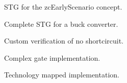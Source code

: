 \documentclass[british, journal]{IEEEtran}
\begin{document}
\begin{figure}[H]
	\begin{centering}
		\par\end{centering}
		\protect\caption{\label{fig:zcEarlyScenario STG}STG for the \textsf{zcEarlyScenario} concept.}
\end{figure}

\begin{figure}[H]
	\begin{centering}
		\par\end{centering}
	\begin{centering}
				\protect\caption{\label{fig:buck STG}Complete STG for a buck converter.}
		\par\end{centering}
\end{figure}

\begin{figure}[H]
	\begin{centering}
		\par\end{centering}
	\begin{centering}
				\protect\caption{\label{fig:custom_assertion}Custom verification of no shortcircuit.}
		\par\end{centering}
\end{figure}

\begin{figure}[H]
	\begin{centering}
		\par\end{centering}
	
		\protect\caption{\label{fig:complex-gate-circuit}Complex gate implementation.}
\end{figure}

\begin{figure}[H]
	\begin{centering}
		\par\end{centering}
	
		\protect\caption{\label{fig:tech-mapped-circuit}Technology mapped implementation.}
\end{figure}
\end{document}
